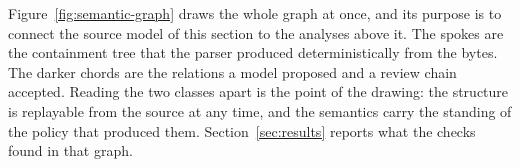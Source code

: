 Figure~\ref{fig:semantic-graph} draws the whole graph at once, and its purpose is to connect the source model of this section to the analyses above it. The spokes are the containment tree that the parser produced deterministically from the bytes. The darker chords are the relations a model proposed and a review chain accepted. Reading the two classes apart is the point of the drawing: the structure is replayable from the source at any time, and the semantics carry the standing of the policy that produced them. Section~\ref{sec:results} reports what the checks found in that graph.
